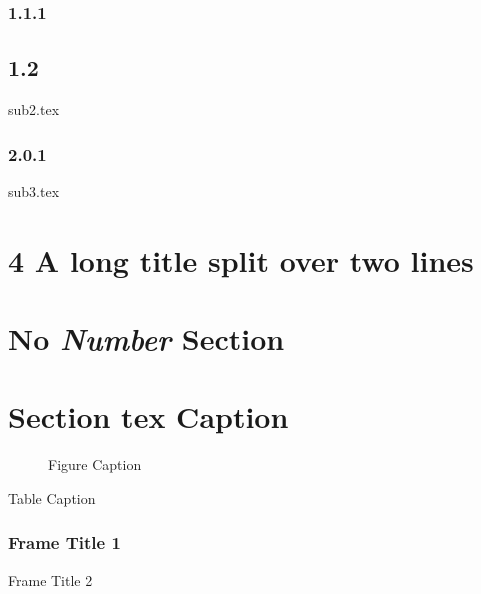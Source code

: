 \documentclass{article}
\begin{document}


\label{sec11}

\subsubsection{1.1.1}

\subsection{1.2}

{sub2.tex}

\subsubsection{2.0.1}

{sub3.tex}

\section{4 A long title split
over two lines}

\section*{No \textit{Number} Section}

\section{Section \texorpdfstring{tex}{pdf} Caption}

\begin{figure}
\end{figure}

\begin{figure}
\caption{Figure Caption}
\end{figure}

\begin{table}
\caption{Table Caption}
\end{table}

\begin{frame}
\frametitle{Frame Title 1}
\end{frame}

\begin{frame} {Frame Title 2}
\end{frame}

\begin{frame}
\end{frame}
\end{document}
